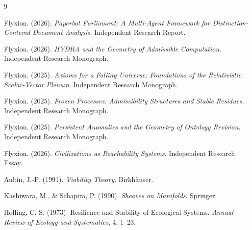 \documentclass[12pt, a4paper]{article}
\theoremstyle{plain}
\theoremstyle{definition}
\theoremstyle{remark}
\begin{document}
\begin{thebibliography}{9}

Flyxion. (2026). \textit{Paperbot Parliament: A Multi-Agent Framework for Distinction-Centered Document Analysis}. Independent Research Report.

Flyxion. (2026). \textit{HYDRA and the Geometry of Admissible Computation}. Independent Research Monograph.

Flyxion. (2025). \textit{Axioms for a Falling Universe: Foundations of the Relativistic Scalar-Vector Plenum}. Independent Research Monograph.

Flyxion. (2025). \textit{Frozen Processes: Admissibility Structures and Stable Residues}. Independent Research Monograph.

Flyxion. (2025). \textit{Persistent Anomalies and the Geometry of Ontology Revision}. Independent Research Monograph.

Flyxion. (2026). \textit{Civilizations as Reachability Systems}. Independent Research Essay.

Aubin, J.-P. (1991). \textit{Viability Theory}. Birkh\"{a}user.

Kashiwara, M., \& Schapira, P. (1990). \textit{Sheaves on Manifolds}. Springer.

Holling, C. S. (1973). Resilience and Stability of Ecological Systems. \textit{Annual Review of Ecology and Systematics}, 4, 1--23.

\end{thebibliography}
\end{document}
